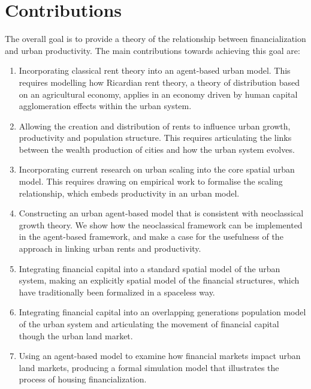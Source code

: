 \section{Contributions}
The overall goal is to provide a theory of the relationship between financialization and urban productivity. The main contributions towards achieving this goal are:
\begin{enumerate}
    \item  Incorporating \gls{classical rent theory} into an \gls{agent-based} urban model. This requires modelling how \gls{Ricardian rent theory}, a theory of distribution based on an agricultural economy, applies in an economy driven by human capital \gls{agglomeration} effects within the urban system. 

    \item Allowing the creation and distribution of rents to influence urban growth, productivity and  population structure. This requires articulating the links between the wealth production of cities and how the urban system evolves.

    \item Incorporating current research on \gls{urban scaling} into the core spatial urban model.  This requires drawing on empirical work to formalise the scaling relationship, which embeds productivity in an urban model. 

    \item Constructing an urban \gls{agent-based model} that is consistent with {neoclassical growth theory}. We show how the neoclassical framework can be implemented in the agent-based framework, and make a case for the usefulness of the approach in linking urban rents and productivity. 

    \item Integrating \gls{financial capital} into a standard spatial model of the urban system, making an explicitly spatial model of the financial structures, which have traditionally been formalized in a spaceless way.
    
    \item Integrating financial capital into an \gls{overlapping generations} population model of the urban system and articulating the movement of financial capital though the urban land market. 
    
    \item Using an agent-based model to examine how financial markets impact urban \glspl{land market}, producing a formal simulation model that illustrates the process of housing financialization. 


\end{enumerate}
